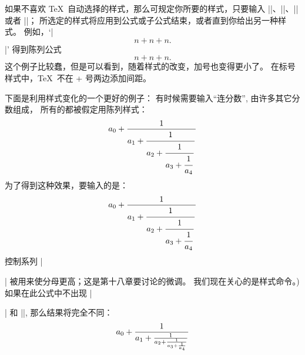 如果不喜欢 \TeX\ 自动选择的样式，那么可规定你所要的样式，只要输入
|\displaystyle|、|\textstyle|、|\scriptstyle| 或者 |\scriptscriptstyle|；
所选定的样式将应用到公式或子公式结束，或者直到你给出另一种样式。
\1例如，`|$$n+\scriptstyle n+\scriptscriptstyle n.$$|' 得到陈列公式
$$n+\scriptstyle n+\scriptscriptstyle n.$$
这个例子比较蠢，但是可以看到，随着样式的改变，加号也变得更小了。
在标号样式中，\TeX\ 不在 + 号两边添加间距。

下面是利用样式变化的一个更好的例子：
有时候需要输入``连分数'', 由许多其它分数组成，
所有的都被假定用陈列样式：
$$a_0+{1\over\displaystyle a_1+
          {\strut 1\over\displaystyle a_2+
            {\strut 1\over\displaystyle a_3+
              {\strut 1\over a_4}}}}$$
为了得到这种效果，要输入的是：
\begintt
$$a_0+{1\over\displaystyle a_1+
        {\strut 1\over\displaystyle a_2+
          {\strut 1\over\displaystyle a_3+
            {\strut 1\over a_4}}}}$$
\endtt
控制系列 |\strut| 被用来使分母更高；这是第十八章要讨论的微调。%
我们现在关心的是样式命令。)
如果在此公式中不出现 |\strut| 和 |\displaystyle|, 那么结果将完全不同：
$$a_0+{1\over a_1+{1\over
      a_2+{1\over a_3+{1\over a_4}}}}$$

